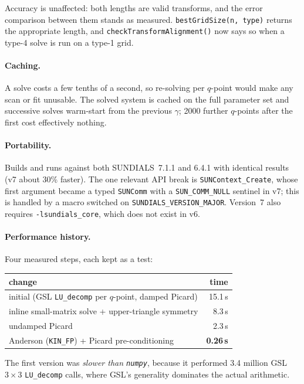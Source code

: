 \documentclass[11pt,a4paper]{article}
\newcommand{\code}[1]{\texttt{\hspace{0pt}#1}}
\begin{document}
Accuracy is unaffected: both lengths are valid transforms, and the error
comparison between them stands as measured. \code{bestGridSize(n, type)}
returns the appropriate length, and \code{checkTransformAlignment()} now says
so when a type-4 solve is run on a type-1 grid.

\paragraph{Caching.} A solve costs a few tenths of a second, so re-solving per
$q$-point would make any scan or fit unusable. The solved system is cached on
the full parameter set and successive solves warm-start from the previous
$\gamma$; 2000 further $q$-points after the first cost effectively nothing.

\paragraph{Portability.} Builds and runs against both SUNDIALS~7.1.1 and
6.4.1 with identical results (v7 about 30\% faster). The one relevant API
break is \code{SUNContext\_Create}, whose first argument became a typed
\code{SUNComm} with a \code{SUN\_COMM\_NULL} sentinel in v7; this is handled
by a macro switched on \code{SUNDIALS\_VERSION\_MAJOR}. Version~7 also
requires \code{-lsundials\_core}, which does not exist in v6.

\paragraph{Performance history.} Four measured steps, each kept as a test:

\begin{center}
\begin{tabular}{lr}
\toprule
change & time\\
\midrule
initial (GSL \code{LU\_decomp} per $q$-point, damped Picard) & 15.1\,s\\
inline small-matrix solve + upper-triangle symmetry          & 8.3\,s\\
undamped Picard                                              & 2.3\,s\\
Anderson (\code{KIN\_FP}) + Picard pre-conditioning          & \textbf{0.26\,s}\\
\bottomrule
\end{tabular}
\end{center}

The first version was \emph{slower than \code{numpy}}, because it performed
3.4 million GSL $3\times3$ \code{LU\_decomp} calls, where GSL's generality
dominates the actual arithmetic.
\end{document}

